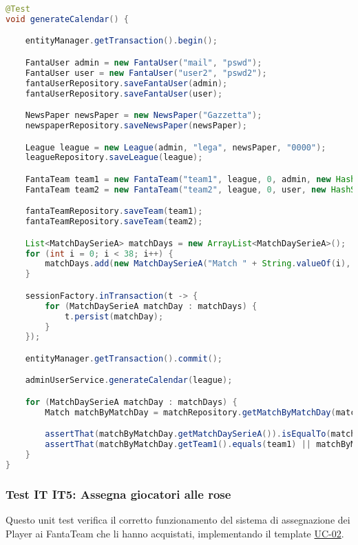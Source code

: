 \begin{lstlisting}[language=Java]
@Test
void generateCalendar() {

	entityManager.getTransaction().begin();

	FantaUser admin = new FantaUser("mail", "pswd");
	FantaUser user = new FantaUser("user2", "pswd2");
	fantaUserRepository.saveFantaUser(admin);
	fantaUserRepository.saveFantaUser(user);

	NewsPaper newsPaper = new NewsPaper("Gazzetta");
	newspaperRepository.saveNewsPaper(newsPaper);

	League league = new League(admin, "lega", newsPaper, "0000");
	leagueRepository.saveLeague(league);

	FantaTeam team1 = new FantaTeam("team1", league, 0, admin, new HashSet<Contract>());
	FantaTeam team2 = new FantaTeam("team2", league, 0, user, new HashSet<Contract>());

	fantaTeamRepository.saveTeam(team1);
	fantaTeamRepository.saveTeam(team2);

	List<MatchDaySerieA> matchDays = new ArrayList<MatchDaySerieA>();
	for (int i = 0; i < 38; i++) {
		matchDays.add(new MatchDaySerieA("Match " + String.valueOf(i), LocalDate.of(2025, 9, 7).plusWeeks(i)));
	}

    sessionFactory.inTransaction(t -> {
		for (MatchDaySerieA matchDay : matchDays) {
			t.persist(matchDay);
		}
	});

	entityManager.getTransaction().commit();

    adminUserService.generateCalendar(league);

	for (MatchDaySerieA matchDay : matchDays) {
		Match matchByMatchDay = matchRepository.getMatchByMatchDay(matchDay, league, team1);

		assertThat(matchByMatchDay.getMatchDaySerieA()).isEqualTo(matchDay);
		assertThat(matchByMatchDay.getTeam1().equals(team1) || matchByMatchDay.getTeam2().equals(team1)).isTrue();
	}
}
\end{lstlisting}


\subsubsection{Test IT IT5: Assegna giocatori alle rose} \label{IT5}

Questo unit test verifica il corretto funzionamento del sistema di assegnazione dei Player ai FantaTeam che li hanno acquistati,
implementando il template \hyperref[UC-02]{UC-02}.

